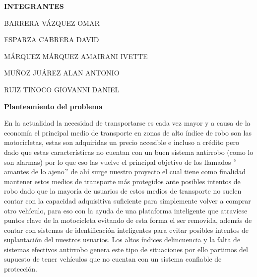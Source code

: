\documentclass[12pt]{article}
\begin{document}
\par

\begin{Center}
{\fontsize{10pt}{12.0pt}\selectfont \textbf{INTEGRANTES}\par}
\end{Center}\par

\begin{Center}
{\fontsize{10pt}{12.0pt}\selectfont BARRERA VÁZQUEZ OMAR\par}
\end{Center}\par

\begin{Center}
{\fontsize{10pt}{12.0pt}\selectfont ESPARZA CABRERA DAVID\par}
\end{Center}\par

\begin{Center}
{\fontsize{10pt}{12.0pt}\selectfont MÁRQUEZ MÁRQUEZ AMAIRANI IVETTE\par}
\end{Center}\par

\begin{Center}
{\fontsize{10pt}{12.0pt}\selectfont MUÑOZ JUÁREZ ALAN ANTONIO\par}
\end{Center}\par

\begin{Center}
{\fontsize{10pt}{12.0pt}\selectfont RUIZ TINOCO GIOVANNI DANIEL\par}
\end{Center}\par


\vspace{\baselineskip}
\textbf{Planteamiento del problema }\par

En la actualidad la necesidad de transportarse es cada vez mayor y a causa de la economía el principal medio de transporte en zonas de alto índice de robo son las motocicletas, estas son adquiridas un precio accesible e incluso a crédito pero dado que estas características no cuentan con un buen sistema antirrobo (como lo son alarmas) por lo que eso las vuelve el principal objetivo de los llamados $``$amantes de lo ajeno$"$  de ahí surge nuestro proyecto el cual tiene como finalidad mantener estos medios de transporte más protegidos ante posibles intentos de robo dado que la mayoría de usuarios de estos medios de transporte no suelen contar con la capacidad adquisitiva suficiente para simplemente volver a comprar otro vehículo, para eso con la ayuda de una plataforma inteligente que atraviese puntos clave de la motocicleta evitando de esta forma el ser removida, además de contar con sistemas de identificación inteligentes para evitar posibles intentos de suplantación del nuestros usuarios. Los altos índices delincuencia y la falta de sistemas efectivos antirrobo genera este tipo de situaciones por ello partimos del supuesto de tener vehículos que no cuentan con un sistema confiable de protección.\par
\end{document}

